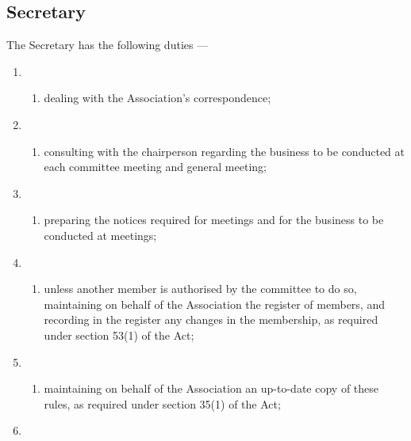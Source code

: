 \documentclass[../constitution.tex]{subfiles}
\begin{document}
\hypertarget{secretary}{%
\subsection{Secretary}\label{secretary}}

The Secretary has the following duties ---

\begin{enumerate}
\item \begin{enumerate}
  \def\labelenumi{\alph{enumi})}
  
  \item dealing with the Association's correspondence;
  \end{enumerate}
\item \begin{enumerate}
  \def\labelenumi{\alph{enumi})}
  \setcounter{enumi}{1}
  
  \item consulting with the chairperson regarding the business to be conducted at each committee meeting and general meeting;
  \end{enumerate}
\item \begin{enumerate}
  \def\labelenumi{\alph{enumi})}
  \setcounter{enumi}{2}
  
  \item preparing the notices required for meetings and for the business to be conducted at meetings;
  \end{enumerate}
\item \begin{enumerate}
  \def\labelenumi{\alph{enumi})}
  \setcounter{enumi}{3}
  
  \item unless another member is authorised by the committee to do so, maintaining on behalf of the Association the register of members, and recording in the register any changes in the membership, as required under section 53(1) of the Act;
  \end{enumerate}
\item \begin{enumerate}
  \def\labelenumi{\alph{enumi})}
  \setcounter{enumi}{4}
  
  \item maintaining on behalf of the Association an up-to-date copy of these rules, as required under section 35(1) of the Act;
  \end{enumerate}
\item \begin{enumerate}
  \def\labelenumi{\alph{enumi})}
  \setcounter{enumi}{5}
  

\end{enumerate}
\end{enumerate}
\end{document}
